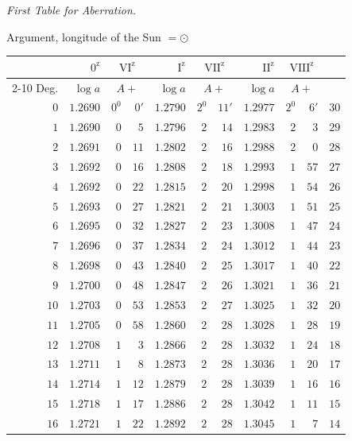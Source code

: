 \begin{center}
\textit{First Table for Aberration.}\par\medskip
Argument, longitude of the Sun $=\odot$\par\medskip
\begingroup\small\setlength{\tabcolsep}{5pt}
\begin{tabular}{r||r|rr||r|rr||r|rr||r}
&$0^{\mathrm z}$&\multicolumn{2}{c||}{$\mathrm{VI}^{\mathrm z}$}&$\mathrm I^{\mathrm z}$&\multicolumn{2}{c||}{$\mathrm{VII}^{\mathrm z}$}&$\mathrm{II}^{\mathrm z}$&\multicolumn{2}{c||}{$\mathrm{VIII}^{\mathrm z}$}&\\\cline{2-10}
Deg.&$\log a$&\multicolumn{2}{c||}{$A+$}&$\log a$&\multicolumn{2}{c||}{$A+$}&$\log a$&\multicolumn{2}{c||}{$A+$}&\\\hline
$0$&$1.2690$&$0^0$&$0'$&$1.2790$&$2^0$&$11'$&$1.2977$&$2^0$&$6'$&$30$\\
$1$&$1.2690$&$0$&$5$&$1.2796$&$2$&$14$&$1.2983$&$2$&$3$&$29$\\
$2$&$1.2691$&$0$&$11$&$1.2802$&$2$&$16$&$1.2988$&$2$&$0$&$28$\\
$3$&$1.2692$&$0$&$16$&$1.2808$&$2$&$18$&$1.2993$&$1$&$57$&$27$\\
$4$&$1.2692$&$0$&$22$&$1.2815$&$2$&$20$&$1.2998$&$1$&$54$&$26$\\
$5$&$1.2693$&$0$&$27$&$1.2821$&$2$&$21$&$1.3003$&$1$&$51$&$25$\\[3pt]
$6$&$1.2695$&$0$&$32$&$1.2827$&$2$&$23$&$1.3008$&$1$&$47$&$24$\\
$7$&$1.2696$&$0$&$37$&$1.2834$&$2$&$24$&$1.3012$&$1$&$44$&$23$\\
$8$&$1.2698$&$0$&$43$&$1.2840$&$2$&$25$&$1.3017$&$1$&$40$&$22$\\
$9$&$1.2700$&$0$&$48$&$1.2847$&$2$&$26$&$1.3021$&$1$&$36$&$21$\\
$10$&$1.2703$&$0$&$53$&$1.2853$&$2$&$27$&$1.3025$&$1$&$32$&$20$\\[3pt]
$11$&$1.2705$&$0$&$58$&$1.2860$&$2$&$28$&$1.3028$&$1$&$28$&$19$\\
$12$&$1.2708$&$1$&$3$&$1.2866$&$2$&$28$&$1.3032$&$1$&$24$&$18$\\
$13$&$1.2711$&$1$&$8$&$1.2873$&$2$&$28$&$1.3036$&$1$&$20$&$17$\\
$14$&$1.2714$&$1$&$12$&$1.2879$&$2$&$28$&$1.3039$&$1$&$16$&$16$\\
$15$&$1.2718$&$1$&$17$&$1.2886$&$2$&$28$&$1.3042$&$1$&$11$&$15$\\[3pt]
$16$&$1.2721$&$1$&$22$&$1.2892$&$2$&$28$&$1.3045$&$1$&$7$&$14$\\

\end{tabular}
\end{center}
